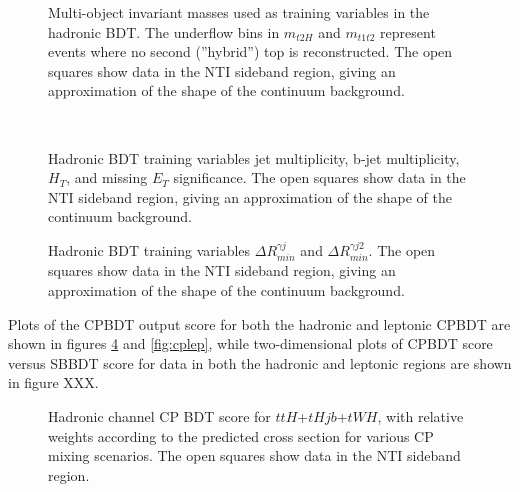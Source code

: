 \begin{figure}[htbp]
  \centering
  \caption{Multi-object invariant masses used as training variables in the hadronic BDT. The underflow bins in $m_{t2H}$ and $m_{t1t2}$ represent events where no second (''hybrid'') top is reconstructed. The open squares show data in the NTI sideband region, giving an approximation of the shape of the continuum background. }
  \label{fig:hadvbls5}
\end{figure}

\begin{figure}[htbp]
  \centering
	 \\
  \caption{Hadronic BDT training variables jet multiplicity, b-jet multiplicity, $H_{T}$, and missing $E_{T}$ significance.  The open squares show data in the NTI sideband region, giving an approximation of the shape of the continuum background. }
  \label{fig:hadvbls6}
\end{figure}

\begin{figure}[htbp]
  \centering
  \caption{Hadronic BDT training variables $\Delta R_{min}^{\gamma j}$ and $\Delta R_{min}^{\gamma j2}$.  The open squares show data in the NTI sideband region, giving an approximation of the shape of the continuum background. }
  \label{fig:hadvbls7}
\end{figure}

Plots of the CPBDT output score for both the hadronic and leptonic CPBDT are shown in figures \ref{fig:cphad} and \ref{fig:cplep}, while two-dimensional plots of CPBDT score versus SBBDT score for data in both the hadronic and leptonic regions are shown in figure XXX.

\begin{figure}[htbp]
  \centering
  \caption{Hadronic channel CP BDT score for $ttH$+$tHjb$+$tWH$, with relative weights according to the predicted cross section for various CP mixing scenarios.  The open squares show data in the NTI sideband region. }
  \label{fig:cphad}
\end{figure}


